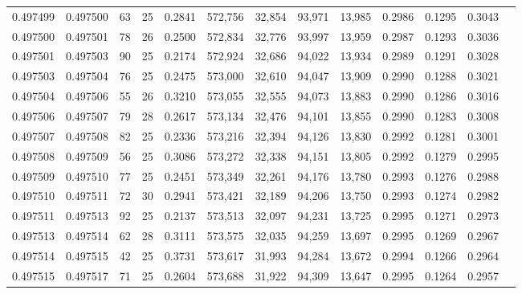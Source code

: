 \begin{tabular}{rrrrrrrrrrrrr}
0.497499 & 0.497500 &  63 &  25 &                                     0.2841 & 572,756 &  32,854 &  93,971 &  13,985 & 0.2986 & 0.1295 & 0.3043 \\
0.497500 & 0.497501 &  78 &  26 &                                     0.2500 & 572,834 &  32,776 &  93,997 &  13,959 & 0.2987 & 0.1293 & 0.3036 \\
0.497501 & 0.497503 &  90 &  25 &                                     0.2174 & 572,924 &  32,686 &  94,022 &  13,934 & 0.2989 & 0.1291 & 0.3028 \\
0.497503 & 0.497504 &  76 &  25 &                                     0.2475 & 573,000 &  32,610 &  94,047 &  13,909 & 0.2990 & 0.1288 & 0.3021 \\
0.497504 & 0.497506 &  55 &  26 &                                     0.3210 & 573,055 &  32,555 &  94,073 &  13,883 & 0.2990 & 0.1286 & 0.3016 \\
0.497506 & 0.497507 &  79 &  28 &                                     0.2617 & 573,134 &  32,476 &  94,101 &  13,855 & 0.2990 & 0.1283 & 0.3008 \\
0.497507 & 0.497508 &  82 &  25 &                                     0.2336 & 573,216 &  32,394 &  94,126 &  13,830 & 0.2992 & 0.1281 & 0.3001 \\
0.497508 & 0.497509 &  56 &  25 &                                     0.3086 & 573,272 &  32,338 &  94,151 &  13,805 & 0.2992 & 0.1279 & 0.2995 \\
0.497509 & 0.497510 &  77 &  25 &                                     0.2451 & 573,349 &  32,261 &  94,176 &  13,780 & 0.2993 & 0.1276 & 0.2988 \\
0.497510 & 0.497511 &  72 &  30 &                                     0.2941 & 573,421 &  32,189 &  94,206 &  13,750 & 0.2993 & 0.1274 & 0.2982 \\
0.497511 & 0.497513 &  92 &  25 &                                     0.2137 & 573,513 &  32,097 &  94,231 &  13,725 & 0.2995 & 0.1271 & 0.2973 \\
0.497513 & 0.497514 &  62 &  28 &                                     0.3111 & 573,575 &  32,035 &  94,259 &  13,697 & 0.2995 & 0.1269 & 0.2967 \\
0.497514 & 0.497515 &  42 &  25 &                                     0.3731 & 573,617 &  31,993 &  94,284 &  13,672 & 0.2994 & 0.1266 & 0.2964 \\
0.497515 & 0.497517 &  71 &  25 &                                     0.2604 & 573,688 &  31,922 &  94,309 &  13,647 & 0.2995 & 0.1264 & 0.2957 \\

\end{tabular}
